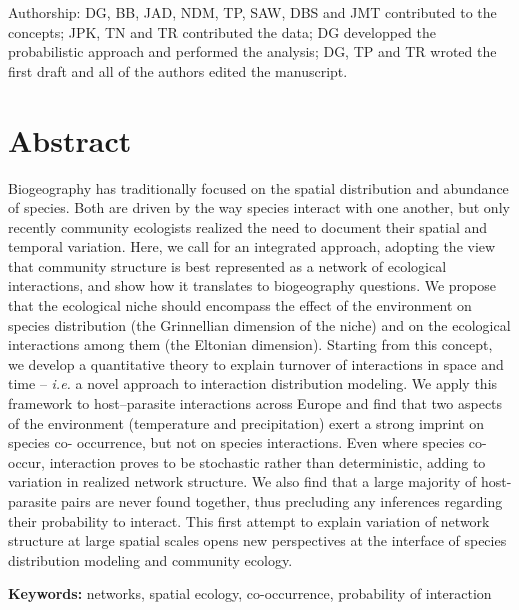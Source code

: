 \documentclass[12pt]{article}
\begin{document}

Authorship: DG, BB, JAD, NDM, TP, SAW, DBS and JMT contributed to the
concepts; JPK, TN and TR contributed the data; DG developped the probabilistic
approach and performed the analysis; DG, TP and TR wroted the first draft and
all of the authors edited the manuscript.

\newpage
\doublespacing

\section*{Abstract}

Biogeography has traditionally focused on the spatial distribution and
abundance of species. Both are driven by the way species interact with one
another, but only recently community ecologists realized the need to document
their spatial and temporal variation. Here, we call for an integrated
approach, adopting the view that community structure is best represented as a
network of ecological interactions, and show how it translates to biogeography
questions. We propose that the ecological niche should encompass the effect of
the environment on species distribution (the Grinnellian dimension of the
niche) and on the ecological interactions among them (the Eltonian dimension).
Starting from this concept, we develop a quantitative theory to explain
turnover of interactions in space and time -- \emph{i.e.} a novel approach to
interaction distribution modeling. We apply this framework to host–parasite
interactions across Europe and find that two aspects of the environment
(temperature and precipitation) exert a strong imprint on species co-
occurrence, but not on species interactions. Even where species co-occur,
interaction proves to be stochastic rather than deterministic, adding to
variation in realized network structure. We also find that a large majority of
host-parasite pairs are never found together, thus precluding any inferences
regarding their probability to interact. This first attempt to explain
variation of network structure at large spatial scales opens new perspectives
at the interface of species distribution modeling and community ecology.

\textbf{Keywords:} networks, spatial ecology, co-occurrence, probability of interaction\\
\end{document}
